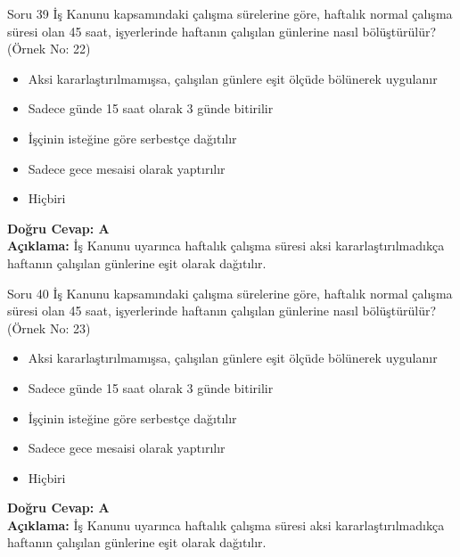 \documentclass[12pt,a4paper]{article}
\begin{document}
\begin{testcard}{Soru 39}
    İş Kanunu kapsamındaki çalışma sürelerine göre, haftalık normal çalışma süresi olan 45 saat, işyerlerinde haftanın çalışılan günlerine nasıl bölüştürülür? (Örnek No: 22)
    \begin{itemize}
        \item[A)] Aksi kararlaştırılmamışsa, çalışılan günlere eşit ölçüde bölünerek uygulanır
        \item[B)] Sadece günde 15 saat olarak 3 günde bitirilir
        \item[C)] İşçinin isteğine göre serbestçe dağıtılır
        \item[D)] Sadece gece mesaisi olarak yaptırılır
        \item[E)] Hiçbiri
    \end{itemize}
    \tcblower
    \textbf{Doğru Cevap: A} \\
    \textbf{Açıklama:} İş Kanunu uyarınca haftalık çalışma süresi aksi kararlaştırılmadıkça haftanın çalışılan günlerine eşit olarak dağıtılır.
\end{testcard}

\begin{testcard}{Soru 40}
    İş Kanunu kapsamındaki çalışma sürelerine göre, haftalık normal çalışma süresi olan 45 saat, işyerlerinde haftanın çalışılan günlerine nasıl bölüştürülür? (Örnek No: 23)
    \begin{itemize}
        \item[A)] Aksi kararlaştırılmamışsa, çalışılan günlere eşit ölçüde bölünerek uygulanır
        \item[B)] Sadece günde 15 saat olarak 3 günde bitirilir
        \item[C)] İşçinin isteğine göre serbestçe dağıtılır
        \item[D)] Sadece gece mesaisi olarak yaptırılır
        \item[E)] Hiçbiri
    \end{itemize}
    \tcblower
    \textbf{Doğru Cevap: A} \\
    \textbf{Açıklama:} İş Kanunu uyarınca haftalık çalışma süresi aksi kararlaştırılmadıkça haftanın çalışılan günlerine eşit olarak dağıtılır.
\end{testcard}
\end{document}
